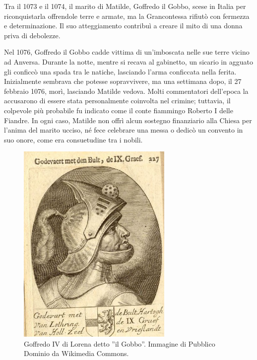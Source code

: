 \documentclass[letterpaper,twocolumn,openany,nodeprecatedcode]{dndbook}
\begin{document}
Tra il 1073 e il 1074, il marito di Matilde, Goffredo il Gobbo, scese in Italia per riconquistarla offrendole terre e armate, ma la Grancontessa rifiutò con fermezza e determinazione. Il suo atteggiamento contribuì a creare il mito di una donna priva di debolezze.

Nel 1076, Goffredo il Gobbo cadde vittima di un'imboscata nelle sue terre vicino ad Anversa. Durante la notte, mentre si recava al gabinetto, un sicario in agguato gli conficcò una spada tra le natiche, lasciando l'arma conficcata nella ferita. Inizialmente sembrava che potesse sopravvivere, ma una settimana dopo, il 27 febbraio 1076, morì, lasciando Matilde vedova. Molti commentatori dell'epoca la accusarono di essere stata personalmente coinvolta nel crimine; tuttavia, il colpevole più probabile fu indicato come il conte fiammingo Roberto I delle Fiandre. In ogni caso, Matilde non offrì alcun sostegno finanziario alla Chiesa per l'anima del marito ucciso, né fece celebrare una messa o dedicò un convento in suo onore, come era consuetudine tra i nobili.

\begin{figure}
\centering
\includegraphics[width=7.5cm]{img/goffredo-il-gobbo.png}
    \caption{\textsf{Goffredo IV di Lorena detto ''il Gobbo''. Immagine di Pubblico Dominio da Wikimedia Commons.}}
    \label{fig:goffredo}
\end{figure}
\end{document}
